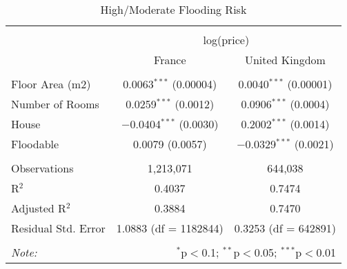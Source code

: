 
\begin{table}[!htbp] \centering 
  \caption{High/Moderate Flooding Risk\vspace*{-0.2cm}} 
  \label{} 
\small 
\begin{tabular}{@{\extracolsep{5pt}}lcc} 
\\[-1.8ex]\hline 
\hline \\[-1.8ex] 
 & \multicolumn{2}{c}{log(price)} \\ 
\cline{2-3} 
 & France & United Kingdom \\ 
\hline \\[-1.8ex] 
 Floor Area (m2) & 0.0063$^{***}$ (0.00004) & 0.0040$^{***}$ (0.00001) \\ 
  Number of Rooms & 0.0259$^{***}$ (0.0012) & 0.0906$^{***}$ (0.0004) \\ 
  House & $-$0.0404$^{***}$ (0.0030) & 0.2002$^{***}$ (0.0014) \\ 
  Floodable & 0.0079 (0.0057) & $-$0.0329$^{***}$ (0.0021) \\ 
 \hline \\[-1.8ex] 
Observations & 1,213,071 & 644,038 \\ 
R$^{2}$ & 0.4037 & 0.7474 \\ 
Adjusted R$^{2}$ & 0.3884 & 0.7470 \\ 
Residual Std. Error & 1.0883 (df = 1182844) & 0.3253 (df = 642891) \\ 
\hline 
\hline \\[-1.8ex] 
\textit{Note:}  & \multicolumn{2}{r}{$^{*}$p$<$0.1; $^{**}$p$<$0.05; $^{***}$p$<$0.01} \\ 
\end{tabular} 
\end{table} 
